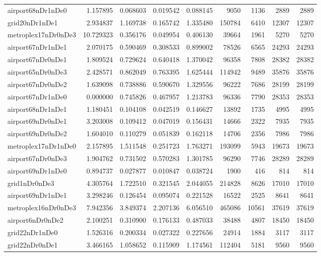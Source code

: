 \begin{longtable}{|l|r|r|r|r|r|r|r|r|}
airport68nDr1nDe0 & 1.157895 & 0.068603 & 0.019542 & 0.088145 & 9050 & 1136 & 2889 & 2889 \\
grid20nDr1nDe1 & 2.934837 & 1.169738 & 0.165742 & 1.335480 & 150784 & 6410 & 12307 & 12307 \\
metroplex17nDr0nDe3 & 10.729323 & 0.356176 & 0.049954 & 0.406130 & 39664 & 1961 & 5270 & 5270 \\
airport67nDr1nDe1 & 2.070175 & 0.590469 & 0.308533 & 0.899002 & 78526 & 6565 & 24293 & 24293 \\
airport67nDr0nDe1 & 1.809524 & 0.729624 & 0.640418 & 1.370042 & 96358 & 7808 & 28382 & 28382 \\
airport65nDr0nDe3 & 2.428571 & 0.862049 & 0.763395 & 1.625444 & 114942 & 9489 & 35876 & 35876 \\
airport67nDr0nDe2 & 1.639098 & 0.738886 & 0.590670 & 1.329556 & 96222 & 7686 & 28199 & 28199 \\
airport67nDr1nDe0 & 0.000000 & 0.745826 & 0.467957 & 1.213783 & 96336 & 7790 & 28353 & 28353 \\
airport68nDr1nDe1 & 1.180451 & 0.104108 & 0.042519 & 0.146627 & 13892 & 1735 & 4995 & 4995 \\
airport69nDr0nDe1 & 3.203008 & 0.109412 & 0.047019 & 0.156431 & 14666 & 2322 & 7935 & 7935 \\
airport69nDr0nDe2 & 1.604010 & 0.110279 & 0.051839 & 0.162118 & 14706 & 2356 & 7986 & 7986 \\
metroplex17nDr1nDe0 & 2.157895 & 1.511548 & 0.251723 & 1.763271 & 193099 & 5943 & 19673 & 19673 \\
airport67nDr0nDe3 & 1.904762 & 0.731502 & 0.570283 & 1.301785 & 96290 & 7746 & 28289 & 28289 \\
airport69nDr1nDe0 & 0.894737 & 0.027877 & 0.010847 & 0.038724 & 1900 & 416 & 814 & 814 \\
grid1nDr0nDe3 & 4.305764 & 1.722510 & 0.321545 & 2.044055 & 214828 & 8626 & 17010 & 17010 \\
airport69nDr1nDe1 & 3.298246 & 0.126454 & 0.095074 & 0.221528 & 16522 & 2525 & 8641 & 8641 \\
metroplex16nDr0nDe3 & 7.942356 & 3.849374 & 2.207136 & 6.056510 & 465086 & 10561 & 37619 & 37619 \\
airport6nDr0nDe2 & 2.100251 & 0.310900 & 0.176133 & 0.487033 & 38488 & 4807 & 18450 & 18450 \\
grid22nDr1nDe0 & 1.526316 & 0.200334 & 0.027322 & 0.227656 & 24914 & 1884 & 3117 & 3117 \\
grid22nDr0nDe1 & 3.466165 & 1.058652 & 0.115909 & 1.174561 & 112404 & 5181 & 9560 & 9560 \\

\end{longtable}
